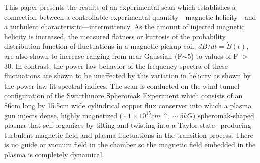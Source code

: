 \documentclass[aps,prl,amsmath,amssymb,reprint,superscriptaddress]{revtex4-1} %
\begin{document}

This paper presents the results of an experimental scan which establishes a connection between a controllable experimental quantity---magnetic helicity---and a turbulent characteristic---intermittency. As the amount of injected magnetic helicity is increased, the measured flatness or kurtosis of the probability distribution function of fluctuations in a magnetic pickup coil, $dB/dt = \dot{B}(t)$, are also shown to increase ranging from near Gaussian (F$\sim 5$) to values of F $>$ 30. In contrast, the power-law behavior of the frequency spectra of these fluctuations are shown to be unaffected by this variation in helicity as shown by the power-law fit spectral indices. The scan is conducted on the wind-tunnel configuration of the Swarthmore Spheromak Experiment which consists of an 86cm long by 15.5cm wide cylindrical copper flux conserver into which a plasma gun injects dense, highly magnetized ($\sim 1\times 10^{15} cm^{-3}, \sim 5kG$) spheromak-shaped plasma that self-organizes by tilting and twisting into a Taylor state~\cite{Gray13,Matthaeus80,Taylor86} producing turbulent magnetic field and plasma fluctuations in the transition process. There is no guide or vacuum field in the chamber so the magnetic field embedded in the plasma is completely dynamical. 
\end{document}
